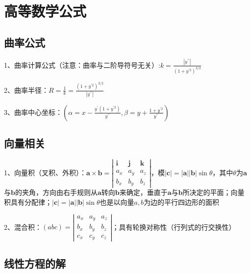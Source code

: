 \chapter{高等数学公式}

\section{曲率公式}

1、曲率计算公式（注意：曲率与二阶导符号无关）:$ k=\frac{\left|y^{\prime \prime}\right|}{\left(1+y^{\prime 2}\right)^{3 / 2}} $

2、曲率半径：$ R=\frac{1}{k}=\frac{\left(1+y^{\prime 2}\right)^{3 / 2}}{\left|y^{\prime \prime}\right|} $

3、曲率中心坐标：$ (\alpha=x-\frac{y^{\prime}\left(1+y^{\prime 2}\right)}{y^{\prime \prime}}, \beta=y+\frac{1+y^{\prime 2}}{y^{\prime \prime}}) $

\section{向量相关}

1、向量积（叉积、外积）：$ \boldsymbol{a} \times \boldsymbol{b}=\left|\begin{array}{ccc}\boldsymbol{i} & \boldsymbol{j} & \boldsymbol{k} \\a_{x} & a_{y} & a_{z} \\b_{x} & b_{y} & b_{z}\end{array}\right| $，模$ |\boldsymbol{c}|=|\boldsymbol{a}||\boldsymbol{b}| \sin \theta $，其中$ \theta $为$ \boldsymbol{a} $与$ \boldsymbol{b} $的夹角，方向由右手规则从$ \boldsymbol{a} $转向$ \boldsymbol{b} $来确定，垂直于$ \boldsymbol{a} $与$ \boldsymbol{b} $所决定的平面；向量积具有分配律；$ |\boldsymbol{c}|=|\boldsymbol{a}||\boldsymbol{b}| \sin \theta $也是以向量$ a,b $为边的平行四边形的面积

2、混合积：$ (a b c)=\left|\begin{array}{lll}a_{x} & a_{y} & a_{z} \\b_{x} & b_{y} & b_{z} \\c_{x} & c_{y} & c_{z}\end{array}\right| $；具有轮换对称性（行列式的行交换性）

\section{线性方程的解}



